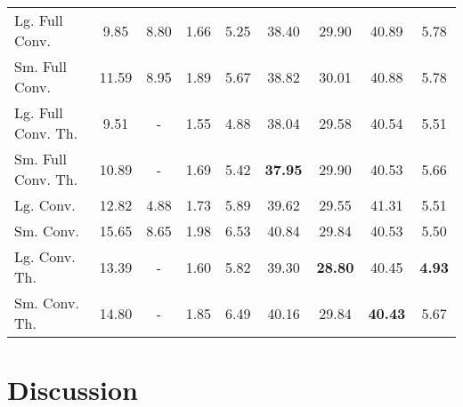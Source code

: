 \documentclass{article} \usepackage{nips15submit_e,times}
\begin{document}
\begin{table}[t]
\begin{center}
\begin{tabular}{lcccccccc}
      Lg. Full Conv. & 9.85 & 8.80 & 1.66 & 5.25 & 38.40 & 29.90 & 40.89 & 5.78 \\
      Sm. Full Conv. & 11.59 & 8.95 & 1.89 & 5.67 & 38.82 & 30.01 & 40.88 & 5.78 \\
      Lg. Full Conv. Th. & 9.51 & - & 1.55 & 4.88 & 38.04 & 29.58 & 40.54 & 5.51 \\
      Sm. Full Conv. Th. & 10.89 & - & 1.69 & 5.42 & \color{blue}\textbf{37.95} & 29.90 & 40.53 & 5.66 \\
      Lg. Conv. & 12.82 & 4.88 & 1.73 & 5.89 & 39.62 & 29.55 & 41.31 & 5.51 \\
      Sm. Conv. & 15.65 & 8.65 & 1.98 & 6.53 & 40.84 & 29.84 & 40.53 & 5.50 \\
      Lg. Conv. Th. & 13.39 & - & 1.60 & 5.82 & 39.30 & \color{blue}\textbf{28.80} & 40.45 & \color{blue}\textbf{4.93} \\
      Sm. Conv. Th. & 14.80 & - & 1.85 & 6.49 & 40.16 & 29.84 & \color{blue}\textbf{40.43} & 5.67 \\
    \end{tabular}
  \end{center}
\end{table}

\section{Discussion}
\end{document}
